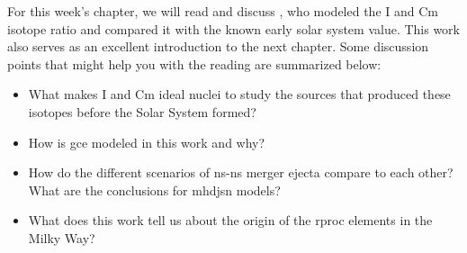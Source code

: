 For this week's chapter, we will read and discuss \citet{cote21}, who modeled the I and Cm isotope ratio and compared it with the known early solar system value. This work also serves as an excellent introduction to the next chapter. Some discussion points that might help you with the reading are summarized below:
\begin{itemize}
    \item What makes I and Cm ideal nuclei to study the sources that produced these isotopes before the Solar System formed?
    \item How is \ac{gce} modeled in this work and why?
    \item How do the different scenarios of \ac{ns}-\ac{ns} merger ejecta compare to each other? What are the conclusions for \ac{mhdjsn} models?
    \item What does this work tell us about the origin of the \ac{rproc} elements in the Milky Way?
\end{itemize}